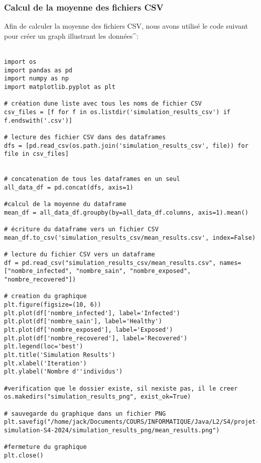\documentclass[french]{article}
\begin{document}
\subsubsection{Calcul de la moyenne des fichiers CSV}

Afin de calculer la moyenne des fichiers CSV, nous avons utilisé le code suivant pour créer un graph illustrant les données^:\\\\

\begin{lstlisting}
import os
import pandas as pd
import numpy as np
import matplotlib.pyplot as plt

# création dune liste avec tous les noms de fichier CSV
csv_files = [f for f in os.listdir('simulation_results_csv') if f.endswith('.csv')]

# lecture des fichier CSV dans des dataframes
dfs = [pd.read_csv(os.path.join('simulation_results_csv', file)) for file in csv_files]


# concatenation de tous les dataframes en un seul
all_data_df = pd.concat(dfs, axis=1)

#calcul de la moyenne du dataframe
mean_df = all_data_df.groupby(by=all_data_df.columns, axis=1).mean()

# écriture du dataframe vers un fichier CSV
mean_df.to_csv('simulation_results_csv/mean_results.csv', index=False)

# lecture du fichier CSV vers un dataframe
df = pd.read_csv("simulation_results_csv/mean_results.csv", names=["nombre_infected", "nombre_sain", "nombre_exposed", "nombre_recovered"])

# creation du graphique
plt.figure(figsize=(10, 6))
plt.plot(df['nombre_infected'], label='Infected')
plt.plot(df['nombre_sain'], label='Healthy')
plt.plot(df['nombre_exposed'], label='Exposed')
plt.plot(df['nombre_recovered'], label='Recovered')
plt.legend(loc='best')
plt.title('Simulation Results')
plt.xlabel('Iteration')
plt.ylabel('Nombre d''individus')

#verification que le dossier existe, sil nexiste pas, il le creer
os.makedirs("simulation_results_png", exist_ok=True)

# sauvegarde du graphique dans un fichier PNG
plt.savefig("/home/jack/Documents/COURS/INFORMATIQUE/Java/L2/S4/projet-simulation-S4-2024/simulation_results_png/mean_results.png")

#fermeture du graphique
plt.close()

\end{lstlisting}
\end{document}
